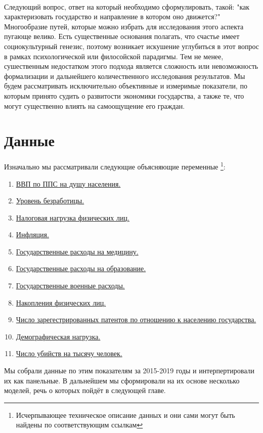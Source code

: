 \documentclass[russian]{vegareport}
\begin{document}
        \\
        Следующий вопрос, ответ на который необходимо сформулировать, такой: "как характеризовать государство и направление в котором оно движется?" Многообразие путей, которые можно избрать для исследования этого аспекта пугающе велико. Есть существенные основания полагать, что счастье имеет социокультурный генезис, поэтому возникает искушение углубиться в этот вопрос в рамках психологической или филосойской парадигмы. Тем не менее, сушественным недостатком этого подхода является сложность или невозможность формализации и дальнейшего количественного исследования результатов. Мы будем рассматривать исключительно объективные и измеримые показатели, по которым принято судить о развитости экономики государства, а также те, что могут существенно влиять на самоощущение его граждан.

        \section{Данные}
        Изначально мы рассматривали следующие объясняющие переменные \footnote{Исчерпывающее техническое описание данных и они сами могут быть найдены по соответствующим ссылкам}:
        \begin{enumerate}
            \item \href{https://data.worldbank.org/indicator/NY.GDP.PCAP.PP.CD}{ВВП по ППС на душу населения.}
            \item \href{https://data.worldbank.org/indicator/GB.XPD.RSDV.GD.ZS?view=chart}{Уровень безработицы.}
            \item \href{https://data.worldbank.org/indicator/IC.TAX.TOTL.CP.ZS?view=chart}{Налоговая нагрузка физических лиц.}
            \item \href{https://data.worldbank.org/indicator/FP.CPI.TOTL.ZG?view=chart}{Инфляция.}
            \item \href{https://data.worldbank.org/indicator/SH.XPD.CHEX.GD.ZS}{Государственные расходы на медицину.}
            \item \href{https://data.worldbank.org/indicator/SE.XPD.TOTL.GD.ZS?view=chart }{Государственные расходы на образование.}
            \item \href{https://data.worldbank.org/indicator/MS.MIL.XPND.GD.ZS}{Государственные военные расходы.}
            \item \href{https://data.worldbank.org/indicator/NY.GNS.ICTR.ZS?view=chart}{Накопления физических лиц.}
            \item \href{https://data.worldbank.org/indicator/IP.PAT.RESD?view=chart}{Число зарегестрированных патентов по отношению к населению государства.}
            \item \href{https://data.worldbank.org/indicator/SP.POP.DPND}{Демографическая нагрузка.}
            \item \href{https://data.worldbank.org/indicator/VC.IHR.PSRC.P5}{Число убийств на тысячу человек.}
        \end{enumerate}
        Мы собрали данные по этим показателям за 2015-2019 годы и интерпертировали их как панельные. В дальнейшем мы сформировали на их основе несколько моделей, речь о которых пойдёт в следующей главе.
\end{document}
